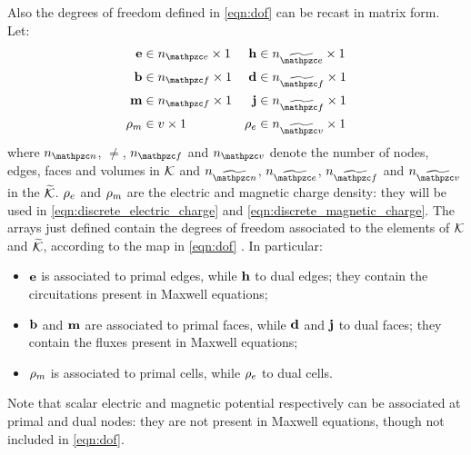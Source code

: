 Also the degrees of freedom defined in \eqref{eqn:dof} can be recast
in matrix form. Let:
\begin{align*}
  \Array{e} & \in \CrossProd{\ne}{1} & \Array{h} & \in \CrossProd{\nde}{1} \\
  \Array{b} & \in \CrossProd{\nf}{1} & \Array{d} & \in \CrossProd{\ndf}{1} \\
  \Array{m} & \in \CrossProd{\nf}{1} & \Array{j} & \in \CrossProd{\ndf}{1} \\
  \Array{\rho}_m & \in \CrossProd{v}{1} & \Array{\rho}_e & \in \CrossProd{\ndv}{1}
\end{align*}
where $\nn$, $\ne$, $\nf$ and $\nv$ denote the number of nodes, edges,
faces and volumes in $\mathcal{K}$ and $\ndn$, $\nde$, $\ndf$ and $\ndv$
in the $\widetilde{\mathcal{K}}$. $\mathbf{\rho}_e$ and $\mathbf{\rho}_m$ are the
electric and magnetic charge density: they will be used in
\eqref{eqn:discrete_electric_charge} and
\eqref{eqn:discrete_magnetic_charge}. The arrays just defined contain
the degrees of freedom associated to the elements of $\mathcal{K}$ and
$\widetilde{\mathcal{K}}$, according to the map in \eqref{eqn:dof}
\cite{trevisan_geometric}. In particular:
\begin{itemize}
\item
  $\mathbf{e}$ is associated to primal edges, while $\mathbf{h}$ to dual
  edges; they contain the circuitations present in Maxwell equations;
\item
  $\mathbf{b}$ and $\mathbf{m}$ are associated to primal faces, while
  $\mathbf{d}$ and $\mathbf{j}$ to dual faces; they contain the fluxes
  present in Maxwell equations;
\item
  $\mathbf{\rho}_m$ is associated to primal cells, while
  $\mathbf{\rho}_e$ to dual cells.
\end{itemize}

Note that scalar electric and magnetic potential respectively can be
associated at primal and dual nodes: they are not present in Maxwell
equations, though not included in \eqref{eqn:dof}.

